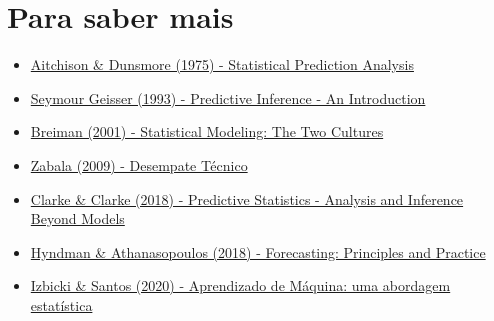\documentclass{beamer}
\begin{document}
\section{Para saber mais}
\begin{frame}{\secname}
    	\begin{itemize}
    	\item \href{https://doi.org/10.1017/CBO9780511569647}{Aitchison \& Dunsmore (1975) - Statistical Prediction Analysis}
    	\item \href{https://doi.org/10.1201/9780203742310}{Seymour Geisser (1993) - Predictive Inference - An Introduction}
    	\item \href{https://projecteuclid.org/euclid.ss/1009213726}{Breiman (2001) - Statistical Modeling: The Two Cultures}
    	\item \href{https://doi.org/10.11606/D.45.2009.tde-01032021-140004}{Zabala (2009) - Desempate Técnico}
    	\item \href{https://doi.org/10.1017/9781139236003}{Clarke \& Clarke (2018) - Predictive Statistics - Analysis and Inference Beyond Models}
    	\item \href{https://otexts.com/fpp2/}{Hyndman \& Athanasopoulos (2018) - Forecasting: Principles and Practice}
    	\item \href{http://www.rizbicki.ufscar.br/ame/}{Izbicki \& Santos (2020) - Aprendizado de Máquina: uma abordagem estatística}
	\end{itemize}
\end{frame}
\end{document}
